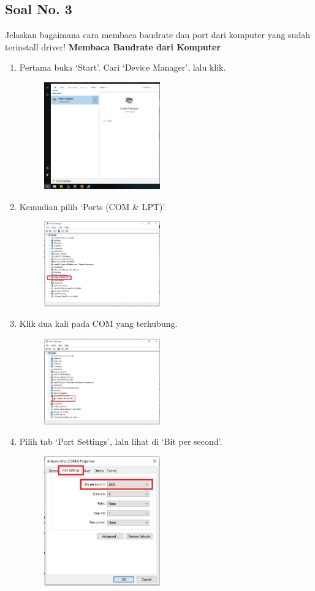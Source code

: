\subsection{Soal No. 3}
Jelaskan bagaimana cara membaca baudrate dan port dari komputer yang sudah terinstall driver!
\textbf{Membaca Baudrate dari Komputer}
\begin{enumerate}
	\item Pertama buka `Start'. Cari `Device Manager', lalu klik.
	\begin{figure}[H]
		\includegraphics[width=5cm]{figures/5/1154121/Teori/d1.png}
		\centering
	\end{figure}
	\item Kemudian pilih `Ports (COM \& LPT)'.
	\begin{figure}[H]
		\includegraphics[width=5cm]{figures/5/1154121/Teori/d3.png}
		\centering
	\end{figure}
	\item Klik dua kali pada COM yang terhubung.
	\begin{figure}[H]
		\includegraphics[width=5cm]{figures/5/1154121/Teori/d2.png}
		\centering
	\end{figure}
	\item Pilih tab `Port Settings', lalu lihat di `Bit per second'.
	\begin{figure}[H]
		\includegraphics[width=5cm]{figures/5/1154121/Teori/d4.png}
		\centering
	\end{figure}
\end{enumerate}
